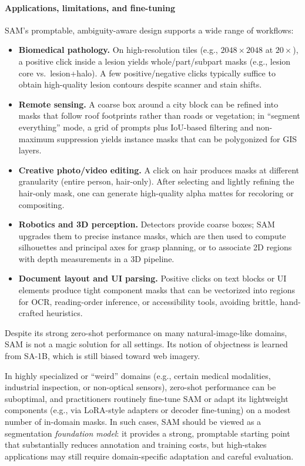 \begin{enrichment}
\begin{enrichment}
		\paragraph{Applications, limitations, and fine-tuning}
		SAM's promptable, ambiguity-aware design supports a wide range of workflows:
		\begin{itemize}
			\item \textbf{Biomedical pathology.} On high-resolution tiles (e.g., \(2048{\times}2048\) at \(20{\times}\)), a positive click inside a lesion yields whole/part/subpart masks (e.g., lesion core vs.\ lesion+halo). A few positive/negative clicks typically suffice to obtain high-quality lesion contours despite scanner and stain shifts.
			\item \textbf{Remote sensing.} A coarse box around a city block can be refined into masks that follow roof footprints rather than roads or vegetation; in ``segment everything'' mode, a grid of prompts plus IoU-based filtering and non-maximum suppression yields instance masks that can be polygonized for GIS layers.
			\item \textbf{Creative photo/video editing.} A click on hair produces masks at different granularity (entire person, hair-only). After selecting and lightly refining the hair-only mask, one can generate high-quality alpha mattes for recoloring or compositing.
			\item \textbf{Robotics and 3D perception.} Detectors provide coarse boxes; SAM upgrades them to precise instance masks, which are then used to compute silhouettes and principal axes for grasp planning, or to associate 2D regions with depth measurements in a 3D pipeline.
			\item \textbf{Document layout and UI parsing.} Positive clicks on text blocks or UI elements produce tight component masks that can be vectorized into regions for OCR, reading-order inference, or accessibility tools, avoiding brittle, hand-crafted heuristics.
		\end{itemize}
		
		Despite its strong zero-shot performance on many natural-image-like domains, SAM is not a magic solution for all settings. Its notion of objectness is learned from SA-1B, which is still biased toward web imagery.
		
		\newpage
		
		In highly specialized or ``weird'' domains (e.g., certain medical modalities, industrial inspection, or non-optical sensors), zero-shot performance can be suboptimal, and practitioners routinely fine-tune SAM or adapt its lightweight components (e.g., via LoRA-style adapters or decoder fine-tuning) on a modest number of in-domain masks. In such cases, SAM should be viewed as a segmentation \emph{foundation model}: it provides a strong, promptable starting point that substantially reduces annotation and training costs, but high-stakes applications may still require domain-specific adaptation and careful evaluation.
		

\end{enrichment}
\end{enrichment}
